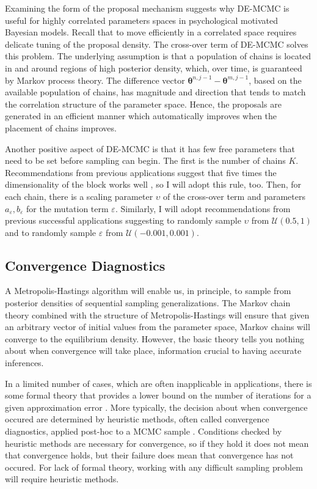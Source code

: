 \documentclass[12pt]{report}
\begin{document}
Examining the form of the proposal mechanism suggests why DE-MCMC is useful for highly correlated parameters spaces in psychological motivated Bayesian models. Recall that to move efficiently in a correlated space requires delicate tuning of the proposal density. The cross-over term of DE-MCMC solves this problem. The underlying assumption is that a population of chains is located in and around regions of high posterior density, which, over time, is guaranteed by Markov process theory. The difference vector $\boldsymbol{\theta}^{n,j-1} - \boldsymbol{\theta}^{m,j-1}$, based on the available population of chains, has magnitude and direction that tends to match the correlation structure of the parameter space. Hence, the proposals are generated in an efficient manner which automatically improves when the placement of chains improves.

Another positive aspect of DE-MCMC is that it has few free parameters that need to be set before sampling can begin. The first is the number of chains $K$. Recommendations from previous applications suggest that five times the dimensionality of the block works well \citep{StoPri1997,Ter2006,TurSed2013}, so I will adopt this rule, too. Then, for each chain, there is a scaling parameter $\upsilon$ of the cross-over term and parameters $a_{\varepsilon}, b_{\varepsilon}$ for the mutation term $\varepsilon$. Similarly, I will adopt recommendations from previous successful applications suggesting to randomly sample $\upsilon$ from $\mathcal{U}(0.5, 1)$ and to randomly sample $\varepsilon$ from $\mathcal{U}(-0.001, 0.001)$.

\subsection{Convergence Diagnostics}

A Metropolis-Hastings algorithm will enable us, in principle, to sample from posterior densities of sequential sampling generalizations. The Markov chain theory combined with the structure of Metropolis-Hastings will ensure that given an arbitrary vector of initial values from the parameter space, Markov chains will converge to the equilibrium density. However, the basic theory tells you nothing about when convergence will take place, information crucial to having accurate inferences.

In a limited number of cases, which are often inapplicable in applications, there is some formal theory that provides a lower bound on the number of iterations for a given approximation error \citep{RobCas2004,GamLop2006}. More typically, the decision about when convergence occured are determined by heuristic methods, often called convergence diagnostics, applied post-hoc to a MCMC sample \citep{GelCar2013}. Conditions checked by heuristic methods are necessary for convergence, so if they hold it does not mean that convergence holds, but their failure does mean that convergence has not occured. For lack of formal theory, working with any difficult sampling problem will require heuristic methods.
\end{document}
